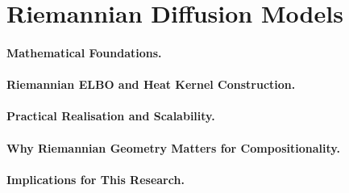 \section{Riemannian Diffusion Models}
\label{sec:riemannian_diffusion_models}

\paragraph{Mathematical Foundations.}

\paragraph{Riemannian ELBO and Heat Kernel Construction.}

\paragraph{Practical Realisation and Scalability.}

\paragraph{Why Riemannian Geometry Matters for Compositionality.}

\paragraph{Implications for This Research.}
